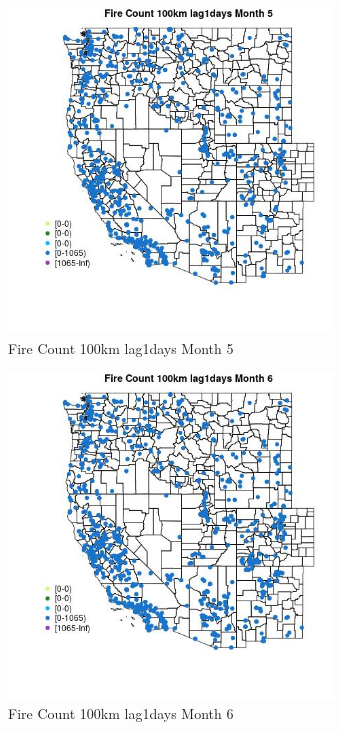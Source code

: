 \begin{figure} 
\centering  
\includegraphics[width=0.77\textwidth]{Code_Outputs/Report_ML_input_PM25_Step4_part_f_de_duplicated_aves_prioritize_24hr_obswNAs_MapObsMo5Fire_Count_100km_lag1days.jpg} 
\caption{\label{fig:Report_ML_input_PM25_Step4_part_f_de_duplicated_aves_prioritize_24hr_obswNAsMapObsMo5Fire_Count_100km_lag1days}Fire Count 100km lag1days Month 5} 
\end{figure} 
 

\clearpage 

\begin{figure} 
\centering  
\includegraphics[width=0.77\textwidth]{Code_Outputs/Report_ML_input_PM25_Step4_part_f_de_duplicated_aves_prioritize_24hr_obswNAs_MapObsMo6Fire_Count_100km_lag1days.jpg} 
\caption{\label{fig:Report_ML_input_PM25_Step4_part_f_de_duplicated_aves_prioritize_24hr_obswNAsMapObsMo6Fire_Count_100km_lag1days}Fire Count 100km lag1days Month 6} 
\end{figure} 
 

